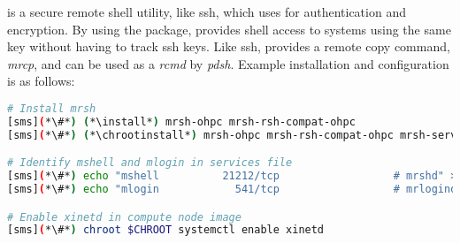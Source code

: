 \mrsh{} is a secure remote shell utility, like ssh, which uses \MUNGE{} 
for authentication and encryption. By using the \MUNGE{} package, \mrsh{} provides 
shell access to systems using the same \MUNGE{} key  without having to track {ssh} keys. 
Like {ssh}, \mrsh{} provides a  remote copy command, {\em mrcp}, and can be used as 
a {\em rcmd} by {\em pdsh}. Example installation and configuration is as follows:

\begin{lstlisting}[language=bash,keywords={},upquote=true]
# Install mrsh
[sms](*\#*) (*\install*) mrsh-ohpc mrsh-rsh-compat-ohpc
[sms](*\#*) (*\chrootinstall*) mrsh-ohpc mrsh-rsh-compat-ohpc mrsh-server-ohpc

# Identify mshell and mlogin in services file
[sms](*\#*) echo "mshell          21212/tcp                  # mrshd" >> /etc/services
[sms](*\#*) echo "mlogin            541/tcp                  # mrlogind" >> /etc/services

# Enable xinetd in compute node image
[sms](*\#*) chroot $CHROOT systemctl enable xinetd
\end{lstlisting}

